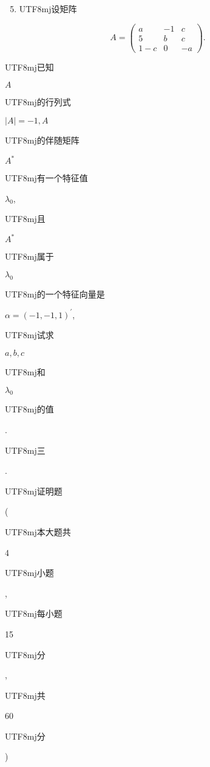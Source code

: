\documentclass[10pt]{article}
\begin{document}
\begin{enumerate}
  \setcounter{enumi}{4}
  \item \begin{CJK}{UTF8}{mj}设矩阵\end{CJK}
\end{enumerate}
$$
A=\left(\begin{array}{ccc}
a & -1 & c \\
5 & b & c \\
1-c & 0 & -a
\end{array}\right) .
$$
\begin{CJK}{UTF8}{mj}已知\end{CJK} $A$ \begin{CJK}{UTF8}{mj}的行列式\end{CJK} $|A|=-1, A$ \begin{CJK}{UTF8}{mj}的伴随矩阵\end{CJK} $A^{*}$ \begin{CJK}{UTF8}{mj}有一个特征值\end{CJK} $\lambda_{0}$, \begin{CJK}{UTF8}{mj}且\end{CJK} $A^{*}$ \begin{CJK}{UTF8}{mj}属于\end{CJK} $\lambda_{0}$ \begin{CJK}{UTF8}{mj}的一个特征向量是\end{CJK} $\alpha=(-1,-1,1)^{\prime}$, \begin{CJK}{UTF8}{mj}试求\end{CJK} $a, b, c$ \begin{CJK}{UTF8}{mj}和\end{CJK} $\lambda_{0}$ \begin{CJK}{UTF8}{mj}的值\end{CJK}. \begin{CJK}{UTF8}{mj}三\end{CJK}. \begin{CJK}{UTF8}{mj}证明题\end{CJK} (\begin{CJK}{UTF8}{mj}本大题共\end{CJK} 4 \begin{CJK}{UTF8}{mj}小题\end{CJK}, \begin{CJK}{UTF8}{mj}每小题\end{CJK} 15 \begin{CJK}{UTF8}{mj}分\end{CJK}, \begin{CJK}{UTF8}{mj}共\end{CJK} 60 \begin{CJK}{UTF8}{mj}分\end{CJK})
\end{document}
